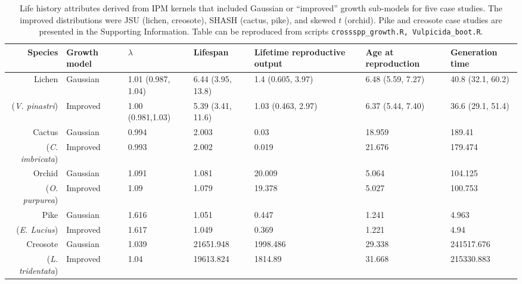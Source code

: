 \documentclass[12pt]{article}
\begin{document}
\begin{spacing}{1.9}
\begin{table}[tbp]
\renewcommand{\arraystretch}{1.5}
	\caption{Life history attributes derived from IPM kernels that included Gaussian or ``improved'' growth sub-models for five case studies. The improved distributions were JSU (lichen, creosote), SHASH (cactus, pike), and skewed $t$ (orchid). Pike and creosote case studies are presented in the Supporting Information. Table can be reproduced from scripts \texttt{crossspp\_growth.R, Vulpicida\_boot.R}.}
	\centering
	\begingroup\fontsize{10pt}{10pt}\selectfont
	\begin{tabular}{rp{1.1cm}|p{2.4cm}p{2.4cm}p{2.4cm}p{2.4cm}p{2.4cm}}
	{\textbf{Species}} & {\textbf{Growth model}} & {\textbf{$\lambda$}} & {\textbf{Lifespan}} & {\textbf{Lifetime reproductive output}} & {\textbf{Age at reproduction}} & {\textbf{Generation time}} \\ 
	\hline
	Lichen & Gaussian & 1.01 (0.987, 1.04) & 6.44 (3.95, 13.8) & 1.4 (0.605, 3.97) & 6.48 (5.59, 7.27) & 40.8 (32.1, 60.2)\\ 
	(\textit{V. pinastri}) & Improved & 1.00 (0.981,1.03) & 5.39 (3.41, 11.6) & 1.03 (0.463, 2.97) & 6.37 (5.44, 7.40) & 36.6 (29.1, 51.4)\\ 
	\hline
	Cactus & Gaussian & 0.994 & 2.003 & 0.03 & 18.959 & 189.41 \\ 
	(\textit{C. imbricata}) & Improved & 0.993 & 2.002 & 0.019 & 21.676 & 179.474 \\ 
	\hline
	Orchid & Gaussian & 1.091 & 1.081 & 20.009 & 5.064 & 104.125 \\ 
	(\textit{O. purpurea}) & Improved & 1.09 & 1.079 & 19.378 & 5.027 & 100.753 \\ 
	\hline
	Pike & Gaussian & 1.616 & 1.051 & 0.447 & 1.241 & 4.963 \\ 
	(\textit{E. Lucius}) & Improved & 1.617 & 1.049 & 0.369 & 1.221 & 4.94 \\ 
	\hline
	Creosote & Gaussian & 1.039 & 21651.948 & 1998.486 & 29.338 & 241517.676 \\ 
	(\textit{L. tridentata}) & Improved & 1.04 & 19613.824 & 1814.89 & 31.668 & 215330.883 \\ 
	\hline 
	\end{tabular}
	\endgroup
	\label{tab:crossspp}
\end{table}


\end{spacing}
\end{document}
